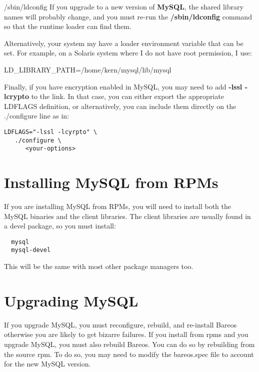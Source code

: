 /sbin/ldconfig If you upgrade to a new version of {\bf MySQL}, the shared
library names will probably change, and you must re-run the {\bf
/sbin/ldconfig} command so that the runtime loader can find them.

Alternatively, your system my have a loader environment variable that can be
set. For example, on a Solaris system where I do not have root permission, I
use:

LD\_LIBRARY\_PATH=/home/kern/mysql/lib/mysql

Finally, if you have encryption enabled in MySQL, you may need to add {\bf
-lssl -lcrypto} to the link. In that case, you can either export the
appropriate LDFLAGS definition, or alternatively, you can include them
directly on the ./configure line as in:

\footnotesize
\begin{verbatim}
LDFLAGS="-lssl -lcyrpto" \
   ./configure \
      <your-options>
\end{verbatim}
\normalsize

\section{Installing MySQL from RPMs}
If you are installing MySQL from RPMs, you will need to install
both the MySQL binaries and the client libraries.  The client
libraries are usually found in a devel package, so you must
install:

\footnotesize
\begin{verbatim}
  mysql
  mysql-devel
\end{verbatim}
\normalsize

This will be the same with most other package managers too.

\section{Upgrading MySQL}
\index[general]{Upgrading}
If you upgrade MySQL, you must reconfigure, rebuild, and re-install
Bareos otherwise you are likely to get bizarre failures.  If you
install from rpms and you upgrade MySQL, you must also rebuild Bareos.
You can do so by rebuilding from the source rpm. To do so, you may need
to modify the bareos.spec file to account for the new MySQL version.
